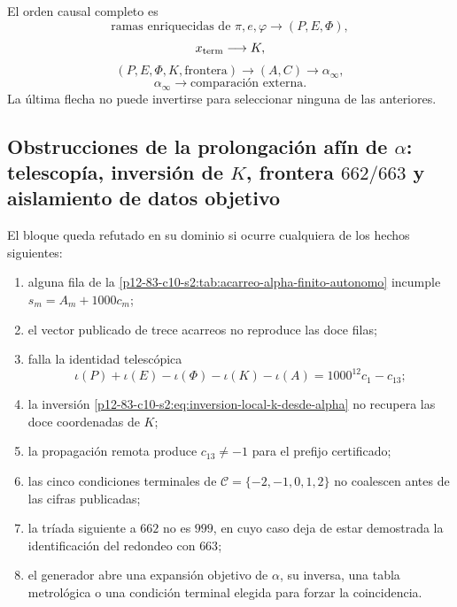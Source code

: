 El orden causal completo es
\[
 \text{ramas enriquecidas de }\pi,e,\varphi
 \longrightarrow(P,E,\Phi),
\]
\[
 x_{\rm term}\longrightarrow K,
\]
\[
 (P,E,\Phi,K,\text{frontera})
 \longrightarrow(A,C)
 \longrightarrow\alpha_\infty,
\]
\[
 \alpha_\infty
 \longrightarrow\text{comparación externa}.
\]
La última flecha no puede invertirse para seleccionar ninguna de las
anteriores.

\subsection{Obstrucciones de la prolongación afín de \(\alpha\): telescopía, inversión de \(K\), frontera \(662/663\) y aislamiento de datos objetivo}

\begin{criterion}
El bloque queda refutado en su dominio si ocurre cualquiera de los hechos
siguientes:
\begin{enumerate}
 \item alguna fila de la \cref{p12-83-c10-s2:tab:acarreo-alpha-finito-autonomo}
       incumple \(s_m=A_m+1000c_m\);
 \item el vector publicado de trece acarreos no reproduce las doce filas;
 \item falla la identidad telescópica
       \[
       \iota(P)+\iota(E)-\iota(\Phi)-\iota(K)-\iota(A)
       =1000^{12}c_1-c_{13};
       \]
 \item la inversión \eqref{p12-83-c10-s2:eq:inversion-local-k-desde-alpha} no recupera
       las doce coordenadas de \(K\);
 \item la propagación remota produce \(c_{13}\neq-1\) para el prefijo
       certificado;
 \item las cinco condiciones terminales de
       \(\mathcal C=\{-2,-1,0,1,2\}\) no coalescen antes de las cifras
       publicadas;
 \item la tríada siguiente a \(662\) no es \(999\), en cuyo caso deja de
       estar demostrada la identificación del redondeo con \(663\);
 \item el generador abre una expansión objetivo de \(\alpha\), su inversa,
       una tabla metrológica o una condición terminal elegida para forzar
       la coincidencia.
\end{enumerate}
\end{criterion}

